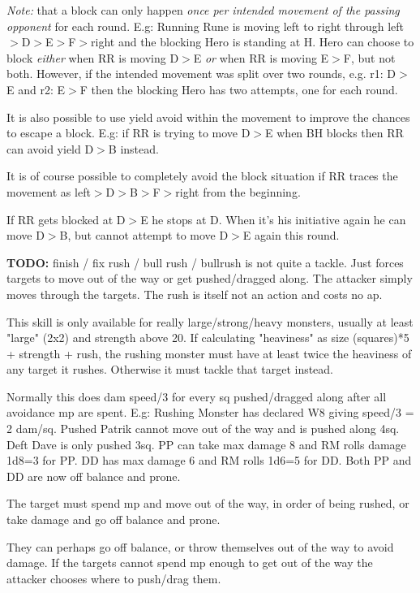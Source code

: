 \emph{Note:} that a block can only happen \emph{once per intended movement of the passing opponent} for each round. E.g: Running Rune is moving left to right through left$>$D$>$E$>$F$>$right and the blocking Hero is standing at H. Hero can choose to block \emph{either} when RR is moving D$>$E \emph{or} when RR is moving E$>$F, but not both. However, if the intended movement was split over two rounds, e.g. r1: D$>$E and r2: E$>$F then the blocking Hero has two attempts, one for each round.

It is also possible to use yield avoid within the movement to improve the chances to escape a block. E.g: if RR is trying to move D$>$E when BH blocks then RR can avoid yield D$>$B instead.

It is of course possible to completely avoid the block situation if RR traces the movement as left$>$D$>$B$>$F$>$right from the beginning.

If RR gets blocked at D$>$E he stops at D. When it's his initiative again he can move D$>$B, but cannot attempt to move D$>$E again this round.


\textbf{TODO:} finish / fix rush / bull rush / bullrush
 is not quite a tackle. Just forces targets to move out of the way or get pushed/dragged along. The attacker simply moves through the targets. The rush is itself not an action and costs no ap. 

This skill is only available for really large/strong/heavy monsters, usually at least "large" (2x2) and strength above 20. If calculating "heaviness" as size (squares)*5 + strength + rush, the rushing monster must have at least twice the heaviness of any target it rushes. Otherwise it must tackle that target instead.

Normally this does dam speed/3 for every sq pushed/dragged along after all avoidance mp are spent. E.g: Rushing Monster has declared W8 giving speed/3 = 2 dam/sq. Pushed Patrik cannot move out of the way and is pushed along 4sq. Deft Dave is only pushed 3sq. PP can take max damage 8 and RM rolls damage 1d8=3 for PP. DD has max damage 6 and RM rolls 1d6=5 for DD. Both PP and DD are now off balance and prone.


The target must spend mp and move out of the way, in order of being rushed, or take damage and go off balance and prone.

 They can perhaps go off balance, or throw themselves out of the way to avoid damage.
If the targets cannot spend mp enough to get out of the way the attacker chooses where to push/drag them.

